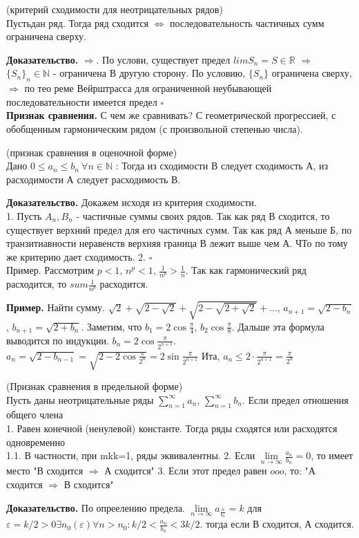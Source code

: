 \begin{theor}
    (критерий сходимости для неотрицательных рядов)\\
    Пустьдан ряд. Тогда ряд сходится $\Leftrightarrow$ последовательность
    частичных сумм ограничена сверху.
\end{theor}
\textbf{Доказательство.} $\Rightarrow$. По услови, существует предел 
$lim S_n=S\in \mathbb{R}$ $\Rightarrow$ $\{S_n\}_n\in\mathbb{N}$ - ограничена
В другую сторону. По условию, $\{S_n\}$ ограничена сверху, $\Rightarrow$ по тео
реме Вейрштрасса для ограниченной неубывающей последовательности имеется предел
$\square$ \\

\textbf{Признак сравнения.} С чем же сравнивать? С геометрической прогрессией, 
с обобщенным гармоническим рядом (с произвольной степенью числа). 
\begin{theor}
    (признак сравнения в оценочной форме)\\
    Дано $0\leqslant a_n\leqslant b_n~\forall n\in\mathbb{N}$ :
    Тогда из сходимости В следует сходимость А, из расходимости А следует
    расходимость В.
\end{theor}
\textbf{Доказательство.}  Докажем исходя из критерия сходимости. \\
1. Пусть $A_n,B_n$ - частичные суммы своих рядов. Так как ряд В сходится, 
то существует верхний предел для его частичных сумм. Так как ряд А меньше Б,
по транзитиавности неравенств верхняя граница В лежит выше чем А. ЧТо по тому 
же критерию дает сходимость. 
2. 
$\square$ \\

Пример. Рассмотрим $p<1$,  $n^p<1$,  $\frac{1}{n^p}>\frac{1}{n}$. Так как 
гармонический ряд расходится, то $sum \frac{1}{n^p}$ расходится. 

\textbf{Пример.} Найти сумму. $\sqrt{2}+\sqrt{2-\sqrt{2} }+\sqrt{2-
\sqrt{2+\sqrt{2} } } +...$, $a_{n+1}=\sqrt{2-b_n} $, $b_{n+1}=\sqrt{2+b_n} $.
Заметим, что $b_1=2\cos\frac{\pi}{4}$, $b_2\cos\frac{\pi}{8}$. Дальше
эта формула выводится по индукции. $b_n=2\cos\frac{\pi}{2^{n+1}}$. 
$a_n=\sqrt{2-b_{n-1}}=\sqrt{2-2\cos\frac{\pi}{2^n}}=2\sin\frac{\pi}{2^{n+1}}$ 
Ита, $a_n\leqslant 2\cdot \frac{\pi}{2^{n+1}}=\frac{\pi}{2^n}$ 

\begin{theor}
    (Признак сравнения в предельной форме)\\
    Пусть даны неотрицательные ряды $\sum\limits_{n=1}^{\infty} a_n$, 
    $\sum\limits_{n=1}^{\infty}b_n$. Если предел отношения общего члена\\
    1. Равен конечной (ненулевой) константе. Тогда ряды сходятся или расходятся 
    одновременно\\
    1.1. В частности, при mkk=1, ряды эквивалентны. 
2. Если $\lim\limits_{n \to \infty} \frac{a_n}{b_n}=0$, то имеет место
"В сходится $\Rightarrow$ А сходится"
3. Если этот предел равен $ooo$, то: "А сходится $\Rightarrow$ В сходится"


\end{theor}
\textbf{Доказательство.} По опреелению предела. 
$\lim\limits_{n \to \infty} a_\frac{n}{b_n}=k$ для $\varepsilon=k/2>0\exists 
n_0(\varepsilon)\forall n>n_0: k/2<\frac{a_n}{b_n}<3k/2$. тогда если В 
сходится, А сходится.

